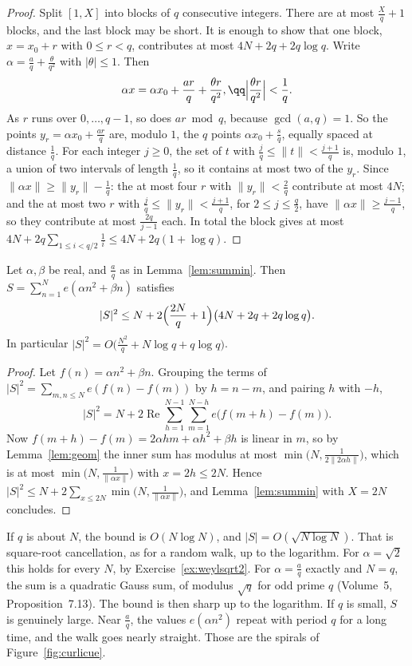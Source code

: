 \begin{proof}
Split $[1,X]$ into blocks of $q$ consecutive integers. There are at most $\frac Xq+1$ blocks, and the last block may be short. It is enough to show that one block, $x=x_0+r$ with $0\le r<q$, contributes at most $4N+2q+2q\log q$. Write
$\alpha=\frac aq+\frac\theta{q^2}$ with $|\theta|\le1$. Then
\[
\alpha x=\alpha x_0+\frac{ar}q+\frac{\theta r}{q^2},\qq\Bigl|\frac{\theta r}{q^2}\Bigr|<\frac1q.
\]
As $r$ runs over $0,\dots,q-1$, so does $ar\bmod q$, because $\gcd(a,q)=1$. So the points $y_r=\alpha x_0+\frac{ar}q$ are, modulo $1$, the $q$ points $\alpha x_0+\frac sq$, equally spaced at distance $\frac1q$. For each
integer $j\ge0$, the set of $t$ with $\frac jq\le\|t\|<\frac{j+1}q$ is, modulo $1$, a union of two intervals of length $\frac1q$, so it contains at most two of the $y_r$. Since $\|\alpha x\|\ge\|y_r\|-\frac1q$: the at most
four $r$ with $\|y_r\|<\frac2q$ contribute at most $4N$; and the at most two $r$ with $\frac jq\le\|y_r\|<\frac{j+1}q$, for $2\le j\le\frac q2$, have $\|\alpha x\|\ge\frac{j-1}q$, so they contribute at most $\frac{2q}{j-1}$
each. In total the block gives at most $4N+2q\sum_{1\le i<q/2}\frac1i\le4N+2q(1+\log q)$.
\end{proof}

\begin{theorem}\label{thm:weylineq}
Let $\alpha,\beta$ be real, and $\frac aq$ as in Lemma~\ref{lem:summin}. Then $S=\sum_{n=1}^Ne(\alpha n^2+\beta n)$ satisfies
\[
|S|^2\le N+2\Bigl(\frac{2N}q+1\Bigr)\bigl(4N+2q+2q\log q\bigr).
\]
In particular $|S|^2=O\bigl(\frac{N^2}q+N\log q+q\log q\bigr)$.
\end{theorem}

\begin{proof}
Let $f(n)=\alpha n^2+\beta n$. Grouping the terms of $|S|^2=\sum_{m,n\le N}e(f(n)-f(m))$ by $h=n-m$, and pairing $h$ with $-h$,
\[
|S|^2=N+2\operatorname{Re}\sum_{h=1}^{N-1}\sum_{m=1}^{N-h}e\bigl(f(m+h)-f(m)\bigr).
\]
Now $f(m+h)-f(m)=2\alpha hm+\alpha h^2+\beta h$ is linear in $m$, so by Lemma~\ref{lem:geom} the inner sum has modulus at most $\min\bigl(N,\frac1{2\|2\alpha h\|}\bigr)$, which is at most $\min\bigl(N,\frac1{\|\alpha x\|}\bigr)$ with $x=2h\le2N$. Hence
$|S|^2\le N+2\sum_{x\le2N}\min\bigl(N,\frac1{\|\alpha x\|}\bigr)$, and Lemma~\ref{lem:summin} with $X=2N$ concludes.
\end{proof}

If $q$ is about $N$, the bound is $O(N\log N)$, and $|S|=O(\sqrt{N\log N})$. That is square-root cancellation, as for a random walk, up to the logarithm. For $\alpha=\sqrt2$ this holds for every $N$, by Exercise~\ref{ex:weylsqrt2}. For $\alpha=\frac aq$ exactly and $N=q$, the sum is a quadratic Gauss sum, of modulus $\sqrt q$ for odd prime $q$ (Volume~5, Proposition~7.13). The bound is then sharp up to the logarithm. If $q$ is small, $S$ is genuinely large. Near $\frac aq$, the values $e(\alpha n^2)$ repeat with period $q$ for a long time, and the walk goes nearly straight. Those are the spirals of Figure~\ref{fig:curlicue}.

